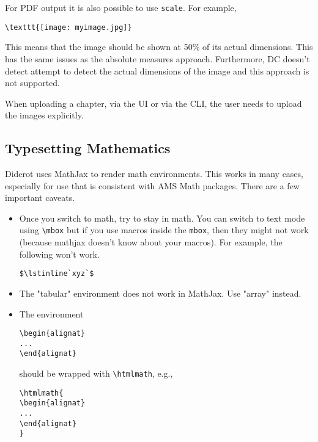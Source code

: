 \begin{important}
For PDF output it is also possible to use \lstinline`scale`.  For example,
\begin{lstlisting}
\texttt{[image: myimage.jpg]}
\end{lstlisting}

This means that the image should be shown at 50\% of its actual dimensions.  This has  the same issues as the absolute measures approach. Furthermore, DC doesn't detect attempt to detect the actual dimensions of the image and this approach is not supported.
\end{important}

\begin{gram}
When uploading a chapter, via the UI or via the CLI, the user needs to upload the images explicitly.   
\end{gram}

\subsection{Typesetting Mathematics}

Diderot uses MathJax to render math environments.  This works in many cases, especially for use that is consistent with AMS Math packages.  There are a few important caveats. 
%
\begin{itemize}
\item Once you switch to math, try to stay in math.  You can switch to text mode using \lstinline`\mbox` but if you use macros inside  the \lstinline`mbox`, then they might not work (because mathjax doesn't know about your macros).  For example, the following won't work. 
\begin{lstlisting}
$\lstinline`xyz`$
\end{lstlisting}

\item The "tabular" environment does not work in MathJax.  Use "array" instead.

\item  The environment 
\begin{lstlisting}
\begin{alignat} 
... 
\end{alignat}
\end{lstlisting}
%
should be wrapped with \lstinline`\htmlmath`, e.g.,
%
\begin{lstlisting}
\htmlmath{
\begin{alignat} 
... 
\end{alignat}
}
\end{lstlisting} 
\end{itemize}


